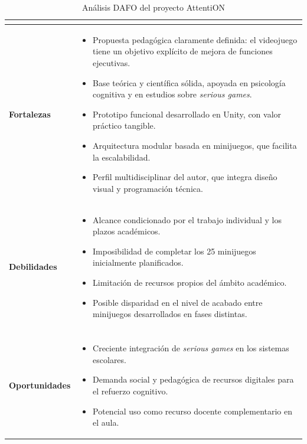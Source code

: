 \documentclass[12pt, a4paper]{report}
\begin{document}
\begin{table}[H]
\centering
\caption{Análisis DAFO del proyecto AttentiON}
\label{tab:dafo}
\renewcommand{\arraystretch}{1.3}
\begin{tabularx}{\textwidth}{|>{\bfseries}p{3.5cm}|X|}
\hline
\multicolumn{2}{|c|}{\textbf{FACTORES INTERNOS}} \\
\hline
Fortalezas &
\begin{itemize}[leftmargin=*, nosep, after=\vspace{2pt}]
  \item Propuesta pedagógica claramente definida: el videojuego tiene un
    objetivo explícito de mejora de funciones ejecutivas.
  \item Base teórica y científica sólida, apoyada en psicología cognitiva
    y en estudios sobre \textit{serious games}.
  \item Prototipo funcional desarrollado en Unity, con valor práctico tangible.
  \item Arquitectura modular basada en minijuegos, que facilita la escalabilidad.
  \item Perfil multidisciplinar del autor, que integra diseño visual y
    programación técnica.
\end{itemize} \\
\hline
Debilidades &
\begin{itemize}[leftmargin=*, nosep, after=\vspace{2pt}]
  \item Alcance condicionado por el trabajo individual y los plazos académicos.
  \item Imposibilidad de completar los 25 minijuegos inicialmente planificados.
  \item Limitación de recursos propios del ámbito académico.
  \item Posible disparidad en el nivel de acabado entre minijuegos desarrollados
    en fases distintas.
\end{itemize} \\
\hline
\multicolumn{2}{|c|}{\textbf{FACTORES EXTERNOS}} \\
\hline
Oportunidades &
\begin{itemize}[leftmargin=*, nosep, after=\vspace{2pt}]
  \item Creciente integración de \textit{serious games} en los sistemas escolares.
  \item Demanda social y pedagógica de recursos digitales para el refuerzo
    cognitivo.
  \item Potencial uso como recurso docente complementario en el aula.

\end{itemize}
\end{tabularx}
\end{table}
\end{document}
